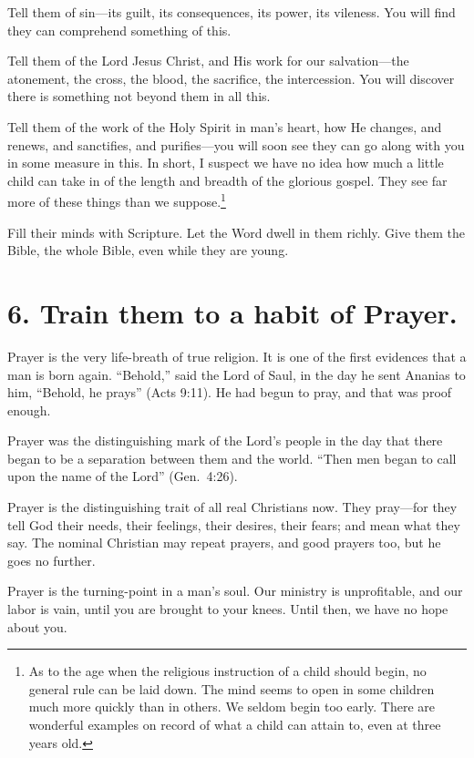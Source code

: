\documentclass[
]{book}
\begin{document}
Tell them of sin---its guilt, its consequences, its power, its vileness. You will find they can comprehend something of this.

Tell them of the Lord Jesus Christ, and His work for our salvation---the atonement, the cross, the blood, the sacrifice, the intercession. You will discover there is something not beyond them in all this.

Tell them of the work of the Holy Spirit in man's heart, how He changes, and renews, and sanctifies, and purifies---you will soon see they can go along with you in some measure in this. In short, I suspect we have no idea how much a little child can take in of the length and breadth of the glorious gospel. They see far more of these things than we suppose.\footnote{As to the age when the religious instruction of a child should begin, no general rule can be laid down. The mind seems to open in some children much more quickly than in others. We seldom begin too early. There are wonderful examples on record of what a child can attain to, even at three years old.}

Fill their minds with Scripture. Let the Word dwell in them richly. Give them the Bible, the whole Bible, even while they are young.

\hypertarget{train-them-to-a-habit-of-prayer.}{%
\section*{6. Train them to a habit of Prayer.}\label{train-them-to-a-habit-of-prayer.}}

Prayer is the very life-breath of true religion. It is one of the first evidences that a man is born again. ``Behold,'' said the Lord of Saul, in the day he sent Ananias to him, ``Behold, he prays'' (Acts 9:11). He had begun to pray, and that was proof enough.

Prayer was the distinguishing mark of the Lord's people in the day that there began to be a separation between them and the world. ``Then men began to call upon the name of the Lord'' (Gen.~4:26).

Prayer is the distinguishing trait of all real Christians now. They pray---for they tell God their needs, their feelings, their desires, their fears; and mean what they say. The nominal Christian may repeat prayers, and good prayers too, but he goes no further.

Prayer is the turning-point in a man's soul. Our ministry is unprofitable, and our labor is vain, until you are brought to your knees. Until then, we have no hope about you.
\end{document}
